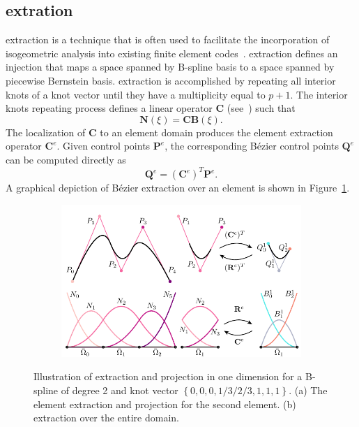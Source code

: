 \subsection{\Bezier extration}

\Bezier extraction is a technique that is often used to facilitate the incorporation of isogeometric analysis into existing finite element codes~\cite{borden2011isogeometric,scott2011isogeometric}. \Bezier extraction defines an injection that maps a space spanned by B-spline basis to a space spanned by piecewise Bernstein basis. \Bezier extraction is accomplished by repeating all interior knots of a knot vector until they have a multiplicity equal to $p+1$. The interior knots repeating process defines a linear operator $\mathbf{C}$ (see~\cite{borden2011isogeometric}) such that
\begin{equation}
    \mathbf{N}(\xi)=\mathbf{C}\mathbf{B}(\xi).
\end{equation}
The localization of $\mathbf{C}$ to an element domain produces the element extraction operator $\mathbf{C}^e$.
Given control points $\mathbf{P}^e$, the corresponding B\'ezier control points $\mathbf{Q}^e$ can be computed directly as
\begin{equation}
    \mathbf{Q}^e=(\mathbf{C}^e)^T\mathbf{P}^e.
\end{equation}
A graphical depiction of B\'{e}zier extraction over an element is shown in Figure~\ref{fig:element_extraction_projection}.

\begin{figure}
    \centering
    \begin{subfigure}{\linewidth}
        \center
        \includegraphics[width=.7\linewidth]{elements_global.pdf}
        \caption{}\label{fig:element_extraction_projection}
    \end{subfigure}
    \begin{subfigure}{\linewidth}
        \center
        
        \caption{}\label{fig:bezier_extraction_process}
    \end{subfigure}
    \caption{Illustration of \Bezier extraction and projection in one dimension for a B-spline of degree 2 and knot vector $\left\{0,0,0,1/3/2/3,1,1,1\right\}$. (a) The element extraction and projection for the second element. (b) \Bezier extraction over the entire domain.}
\end{figure}

